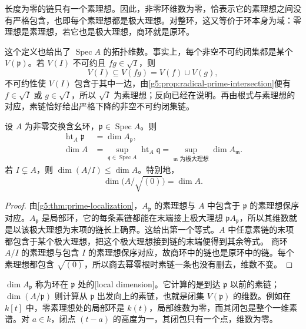 长度为零的链只有一个素理想。因此，非零环维数为零，恰表示它的素理想之间没有严格包含，也即每个素理想都是极大理想。对整环，这又等价于环本身为域：零理想是素理想，若它也是极大理想，商环就是原环。

\ProseParagraphBreak

这个定义也给出了 \(\operatorname{Spec}A\) 的拓扑维数。事实上，每个非空不可约闭集都是某个 \(V(\mathfrak p)\)。若 \(V(I)\) 不可约且 \(fg\in\sqrt I\)，则
\[
	V(I)\subseteq V(fg)=V(f)\cup V(g),
\]
不可约性使 \(V(I)\) 包含于其中一边，由\cref{g5:prop:radical-prime-intersection}便有 \(f\in\sqrt I\) 或 \(g\in\sqrt I\)，所以 \(\sqrt I\) 为素理想；反向已经在说明。再由根式与素理想的对应，素链恰好给出严格下降的非空不可约闭集链。

\begin{proposition}\label{g5:prop:dimension-localization}
	设 \(A\) 为非零交换含幺环，\(\mathfrak p\in\operatorname{Spec}A\)。则
	\begin{equation}\label{g5:eq:height-local-dimension}
	\begin{aligned}
	\operatorname{ht}_A\mathfrak p&=\dim A_{\mathfrak p},\\
	\dim A&=\sup_{\mathfrak q\in\operatorname{Spec}A}\operatorname{ht}_A\mathfrak q
	=\sup_{\mathfrak m\text{ 为极大理想}}\dim A_{\mathfrak m}.
	\end{aligned}
	\end{equation}
	若 \(I\subsetneq A\)，则 \(\dim(A/I)\leq\dim A\)。特别地，
	\[
	\dim\bigl(A/\sqrt{(0)}\bigr)=\dim A.
	\]
\end{proposition}
\begin{proof}
	由\cref{g5:thm:prime-localization}，\(A_{\mathfrak p}\) 的素理想与 \(A\) 中包含于 \(\mathfrak p\) 的素理想保序对应。\(A_{\mathfrak p}\) 是局部环，它的每条素链都能在末端接上极大理想 \(\mathfrak pA_{\mathfrak p}\)，所以其维数就是以该极大理想为末项的链长上确界。这给出第一个等式。\(A\) 中任意素链的末项都包含于某个极大理想，把这个极大理想接到链的末端便得到其余等式。
	商环 \(A/I\) 的素理想与包含 \(I\) 的素理想保序对应，故商环中的链也是原环中的链。每个素理想都包含 \(\sqrt{(0)}\)，所以商去幂零根时素链一条也没有删去，维数不变。
\end{proof}

\(\dim A_{\mathfrak p}\) 称为环在 \(\mathfrak p\) 处的[local dimension]。它计算的是到达 \(\mathfrak p\) 以前的素链；\(\dim(A/\mathfrak p)\) 则计算从 \(\mathfrak p\) 出发向上的素链，也就是闭集 \(V(\mathfrak p)\) 的维数。例如在 \(k[t]\) 中，零素理想处的局部环是 \(k(t)\)，局部维数为零，而其闭包是整个一维素谱。对 \(a\in k\)，闭点 \((t-a)\) 的高度为一，其闭包只有一个点，维数为零。

